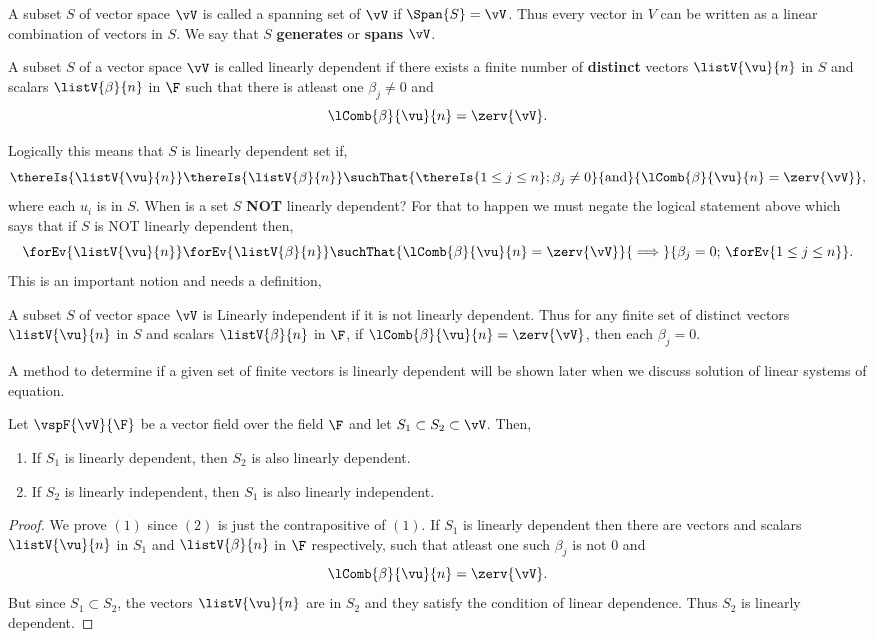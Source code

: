 \begin{Definition}[name=Spanning set]
    A subset $S$ of vector space $\vV$ is called a spanning set of $\vV$ if $\Span{S} = \vV$. Thus every
    vector in $V$ can be written as a linear combination of vectors in $S$. We say that $S$ \textbf{generates}
    or \textbf{spans} $\vV$.
\end{Definition}
\begin{Definition}[name=Linear dependence]
    A subset $S$ of a vector space $\vV$ is called linearly dependent if there exists a finite number of
    \textbf{distinct} vectors $\listV{\vu}{n}$ in $S$ and scalars $\listV{\beta}{n}$ in $\F$ such that there
    is atleast one $\beta_{j} \neq 0$ and
    \[\lComb{\beta}{\vu}{n} = \zerv{\vV}.\]
\end{Definition}
Logically this means that $S$ is linearly dependent set if,
\[\thereIs{\listV{\vu}{n}}\thereIs{\listV{\beta}{n}}
    \suchThat{\thereIs{1\leq j \leq n};\beta_j\neq
	    0}{\text{and}}{\lComb{\beta}{\vu}{n} = \zerv{\vV}},\]
where each $u_i$ is in $S$. When is a set $S$ \textbf{NOT} linearly dependent? For that to happen we must
negate the logical statement above which says that if $S$ is NOT linearly dependent then,
\[\forEv{\listV{\vu}{n}}\forEv{\listV{\beta}{n}}
    \suchThat{\lComb{\beta}{\vu}{n} = \zerv{\vV}}{\implies}{\beta_{j}=0;\,\forEv{1\leq j\leq n}}.\]
This is an important notion and needs a definition,
\begin{Definition}[name=Linear independence]
    A subset $S$ of vector space $\vV$ is Linearly independent if it is not linearly dependent. Thus for any
    finite set of distinct vectors $\listV{\vu}{n}$ in $S$ and scalars $\listV{\beta}{n}$ in $\F$, if
    $\lComb{\beta}{\vu}{n} = \zerv{\vV}$, then each $\beta_{j} = 0$. 
\end{Definition}
A method to determine if a given set of finite vectors is linearly dependent will be shown later when we
discuss solution of linear systems of equation.
\begin{Proposition}
    Let $\vspF{\vV}{\F}$ be a vector field over the field $\F$ and let $S_1\subset S_2\subset\vV$.
    Then,
    \begin{enumerate}
	\item
	    If $S_1$ is linearly dependent, then $S_2$ is also linearly dependent.
	\item
	    If $S_2$ is linearly independent, then $S_1$ is also linearly independent.
    \end{enumerate}
    \begin{proof}
	We prove $(1)$ since $(2)$ is just the contrapositive of $(1)$.
	If $S_1$ is linearly dependent then there are vectors and scalars $\listV{\vu}{n}$ in $S_1$ and
	$\listV{\beta}{n}$ in $\F$ respectively, such that atleast one such $\beta_{j}$ is not $0$ and
	\[\lComb{\beta}{\vu}{n} = \zerv{\vV}.\]
	But since $S_1 \subset S_2$, the vectors $\listV{\vu}{n}$ are in $S_2$ and they satisfy the condition
	of linear dependence. Thus $S_2$ is linearly dependent.
    \end{proof}
\end{Proposition}

